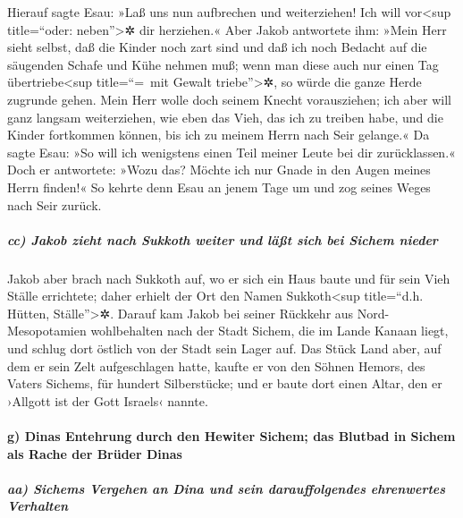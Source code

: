  Hierauf sagte Esau: »Laß uns nun aufbrechen und
weiterziehen! Ich will vor\textless sup title=``oder:
neben''\textgreater✲ dir herziehen.«  Aber Jakob
antwortete ihm: »Mein Herr sieht selbst, daß die Kinder noch zart sind
und daß ich noch Bedacht auf die säugenden Schafe und Kühe nehmen muß;
wenn man diese auch nur einen Tag übertriebe\textless sup title=``=~mit
Gewalt triebe''\textgreater✲, so würde die ganze Herde zugrunde gehen.
 Mein Herr wolle doch seinem Knecht vorausziehen; ich
aber will ganz langsam weiterziehen, wie eben das Vieh, das ich zu
treiben habe, und die Kinder fortkommen können, bis ich zu meinem Herrn
nach Seir gelange.«  Da sagte Esau: »So will ich
wenigstens einen Teil meiner Leute bei dir zurücklassen.« Doch er
antwortete: »Wozu das? Möchte ich nur Gnade in den Augen meines Herrn
finden!«  So kehrte denn Esau an jenem Tage um und zog
seines Weges nach Seir zurück.

\hypertarget{cc-jakob-zieht-nach-sukkoth-weiter-und-luxe4uxdft-sich-bei-sichem-nieder}{%
\subparagraph{cc) Jakob zieht nach Sukkoth weiter und läßt sich bei
Sichem
nieder}\label{cc-jakob-zieht-nach-sukkoth-weiter-und-luxe4uxdft-sich-bei-sichem-nieder}}

 Jakob aber brach nach Sukkoth auf, wo er sich ein Haus
baute und für sein Vieh Ställe errichtete; daher erhielt der Ort den
Namen Sukkoth\textless sup title=``d.h. Hütten, Ställe''\textgreater✲.
 Darauf kam Jakob bei seiner Rückkehr aus
Nord-Mesopotamien wohlbehalten nach der Stadt Sichem, die im Lande
Kanaan liegt, und schlug dort östlich von der Stadt sein Lager auf.
 Das Stück Land aber, auf dem er sein Zelt aufgeschlagen
hatte, kaufte er von den Söhnen Hemors, des Vaters Sichems, für hundert
Silberstücke;  und er baute dort einen Altar, den er
›Allgott ist der Gott Israels‹ nannte.

\hypertarget{g-dinas-entehrung-durch-den-hewiter-sichem-das-blutbad-in-sichem-als-rache-der-bruxfcder-dinas}{%
\paragraph{g) Dinas Entehrung durch den Hewiter Sichem; das Blutbad in
Sichem als Rache der Brüder
Dinas}\label{g-dinas-entehrung-durch-den-hewiter-sichem-das-blutbad-in-sichem-als-rache-der-bruxfcder-dinas}}

\hypertarget{aa-sichems-vergehen-an-dina-und-sein-darauffolgendes-ehrenwertes-verhalten}{%
\subparagraph{aa) Sichems Vergehen an Dina und sein darauffolgendes
ehrenwertes
Verhalten}\label{aa-sichems-vergehen-an-dina-und-sein-darauffolgendes-ehrenwertes-verhalten}}

